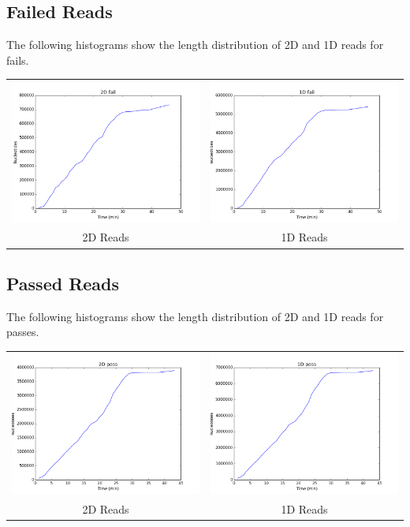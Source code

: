 \subsection*{Failed Reads}

        The following histograms show the length distribution of 2D and 1D reads for fails.

        
        \begin{tabular}{cc}
          \includegraphics[width=.48\textwidth]{failcum2D}
          &
          \includegraphics[width=.48\textwidth]{failcum1D}
          \\
          2D Reads
          &
          1D Reads
        \end{tabular}

\subsection*{Passed Reads}

        The following histograms show the length distribution of 2D and 1D reads for passes.

        
        \begin{tabular}{cc}
          \includegraphics[width=.48\textwidth]{passcum2D}
          &
          \includegraphics[width=.48\textwidth]{passcum1D}
          \\
          2D Reads
          &
          1D Reads
        \end{tabular}
